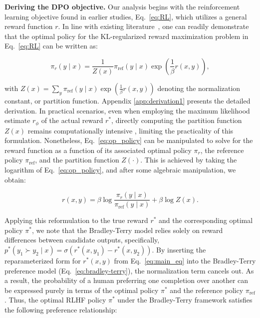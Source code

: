 \textbf{Deriving the DPO objective.} Our analysis begins with the reinforcement learning objective found in earlier studies, Eq.~\ref{eq:RL}, which utilizes a general reward function $r$. In line with existing literature~\citep{peters2007reinforcement, peng2019advantage, korbak2022reinforcement, go2023aligning}, one can readily demonstrate that the optimal policy for the KL-regularized reward maximization problem in Eq.~\ref{eq:RL} can be written as:

\begin{equation}\label{eq:op_policy}
    \pi_r(y\mid x) = \frac{1}{Z(x)}\pi_\text{ref}(y\mid x)\exp\left(\frac{1}{\beta}r(x, y)\right),
\end{equation}

with $Z(x) =\sum_{y}\pi_\text{ref}(y\mid x)\exp\left(\frac{1}{\beta}r(x, y)\right)$ denoting the normalization constant, or partition function. Appendix \ref{app:derivation1} presents the detailed derivation. In practical scenarios, even when employing the maximum likelihood estimate $r_\phi$ of the actual reward $r^*$, directly computing the partition function $Z(x)$ remains computationally intensive \citep{korbak2022reinforcement, go2023aligning}, limiting the practicality of this formulation. Nonetheless, Eq.~\ref{eq:op_policy} can be manipulated to solve for the reward function as a function of its associated optimal policy $\pi_r$, the reference policy $\pi_\text{ref}$, and the partition function $Z(\cdot)$. This is achieved by taking the logarithm of Eq.~\ref{eq:op_policy}, and after some algebraic manipulation, we obtain:

\begin{equation}\label{eq:main_eq}
    r(x,y) =\beta \log \frac{\pi_r(y\mid x)}{\pi_\text{ref}(y\mid x)} + \beta \log Z(x).
\end{equation}

Applying this reformulation to the true reward $r^*$ and the corresponding optimal policy $\pi^*$, we note that the Bradley-Terry model relies solely on reward differences between candidate outputs, specifically, ${p^*(y_1 \succ y_2 \mid x) = \sigma(r^*(x, y_1) - r^*(x, y_2))}$. By inserting the reparameterized form for $r^*(x,y)$ from Eq.~\ref{eq:main_eq} into the Bradley-Terry preference model (Eq.~\ref{eq:bradley-terry}), the normalization term cancels out. As a result, the probability of a human preferring one completion over another can be expressed purely in terms of the optimal policy $\pi^*$ and the reference policy $\pi_\text{ref}$. Thus, the optimal RLHF policy $\pi^*$ under the Bradley-Terry framework satisfies the following preference relationship:

